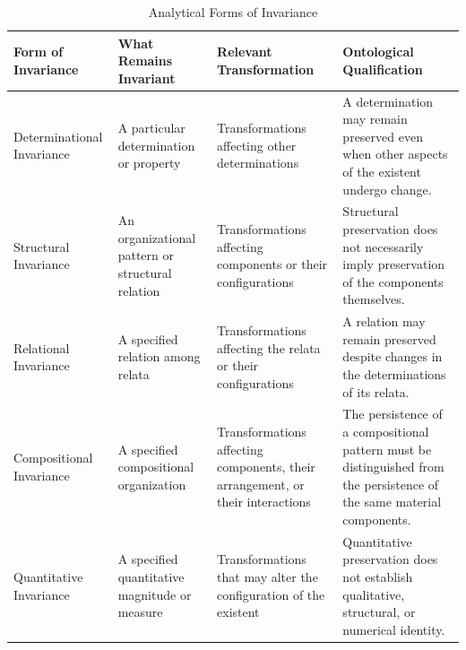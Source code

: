 \begin{table}[htbp]
    \centering
    \small
    \renewcommand{\arraystretch}{1.35}
    \setlength{\tabcolsep}{5pt}

    \caption{Analytical Forms of Invariance}
    \label{tab:forms-of-invariance}

    \begin{tabular}{
        p{2.7cm}
        p{3.1cm}
        p{3.4cm}
        p{4.0cm}
    }
        \hline
        \textbf{Form of Invariance}
        &
        \textbf{What Remains Invariant}
        &
        \textbf{Relevant Transformation}
        &
        \textbf{Ontological Qualification}
        \\
        \hline

        Determinational Invariance
        &
        A particular determination or property
        &
        Transformations affecting other determinations
        &
        A determination may remain preserved even when other aspects
        of the existent undergo change.
        \\
        \hline

        Structural Invariance
        &
        An organizational pattern or structural relation
        &
        Transformations affecting components or their configurations
        &
        Structural preservation does not necessarily imply preservation
        of the components themselves.
        \\
        \hline

        Relational Invariance
        &
        A specified relation among relata
        &
        Transformations affecting the relata or their configurations
        &
        A relation may remain preserved despite changes in the
        determinations of its relata.
        \\
        \hline

        Compositional Invariance
        &
        A specified compositional organization
        &
        Transformations affecting components, their arrangement,
        or their interactions
        &
        The persistence of a compositional pattern must be distinguished
        from the persistence of the same material components.
        \\
        \hline

        Quantitative Invariance
        &
        A specified quantitative magnitude or measure
        &
        Transformations that may alter the configuration of the existent
        &
        Quantitative preservation does not establish qualitative,
        structural, or numerical identity.
        \\
        \hline


\end{tabular}
\end{table}
